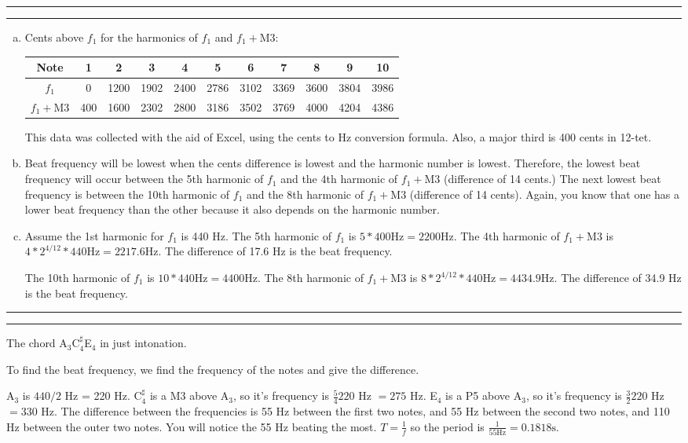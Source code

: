 \documentclass[11pt]{article}
\newcounter{questionCounter}
\newcounter{partCounter}[questionCounter]
\newenvironment{question}[2][\arabic{questionCounter}]{%
    \setcounter{partCounter}{0}%
    \vspace{.25in} \hrule \vspace{0.5em}%
        \noindent{\bf #2}%
    \vspace{0.8em} \hrule \vspace{.10in}%
    \addtocounter{questionCounter}{1}%
}{}
\begin{document}
\begin{question}{Problem 7}
\begin{enumerate}[a.]
\item
Cents above $f_1$ for the harmonics of $f_1$ and $f_1+\text{M}3$:\\
\begin{center}
\begin{tabular}{|c || c | c | c | c | c | c | c | c | c | c|}                     \hline
Note              & 1   & 2    & 3    & 4    & 5    & 6    & 7    & 8    & 9    & 10  \\ \hline
$f_1$             & 0   & 1200 & 1902 & 2400 & 2786 & 3102 & 3369 & 3600 & 3804 & 3986\\ \hline
$f_1 + \text{M}3$ & 400 & 1600 & 2302 & 2800 & 3186 & 3502 & 3769 & 4000 & 4204 & 4386\\ \hline
\end{tabular}
\end{center}
This data was collected with the aid of Excel, using the cents to Hz conversion formula. 
Also, a major third is 400 cents in 12-tet.
\item Beat frequency will be lowest when the cents difference is lowest and the harmonic
number is lowest. Therefore, the lowest beat frequency will occur between the 5th harmonic
of $f_1$ and the 4th harmonic of $f_1 + \text{M}3$ (difference of 14 cents.) The next
lowest beat frequency is between the 10th harmonic of $f_1$ and the 8th harmonic of 
$f_1 + \text{M}3$ (difference of 14 cents). Again, you know that one has a lower
beat frequency than the other because it also depends on the harmonic number. 
\item Assume the 1st harmonic for $f_1$ is 440 Hz. 
The 5th harmonic of $f_1$ is $5*400 \text{Hz} = 2200 \text{Hz}$. The 4th harmonic
of $f_1 + \text{M}3$ is $4*2^{4/12}*440 \text{Hz} = 2217.6 \text{Hz}$. The difference of
17.6 Hz is the beat frequency.

The 10th harmonic of $f_1$ is $10*440 \text{Hz} = 4400 \text{Hz}$. The 8th harmonic
of $f_1 + \text{M}3$ is $8*2^{4/12}*440 \text{Hz} = 4434.9 \text{Hz}$. The difference of
34.9 Hz is the beat frequency.
\end{enumerate}
\end{question}
\begin{question}{Problem 8}
The chord A$_3$C$_4^\sharp$E$_4$ in just intonation.

To find the beat frequency, we find the frequency of the notes and give the 
difference.

A$_3$ is $440/2$ Hz = 220 Hz. C$_4^\sharp$ is a M3 above A$_3$, so it's frequency is
$\frac{5}{4}220$ Hz $= 275$ Hz. E$_4$ is a P5 above A$_3$, so it's frequency is
$\frac{3}{2}220$ Hz $= 330$ Hz. The difference between the frequencies is 55 Hz 
between the first two notes, and 55 Hz between the second two notes, and 110 Hz
between the outer two notes. You will notice the 55 Hz beating the most. $T=\frac{1}{f}$
so the period is $\frac{1}{55 \text{Hz}} = 0.1818 \text{s}$.
\end{question}
\end{document}
